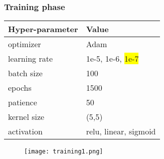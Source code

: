 \begin{frame}
  \frametitle{Training phase}
  \begin{table}[h!]
      \scriptsize
      \centering
      \begin{tabular}{l l}
      \toprule
      \textbf{Hyper-parameter} & \hspace*{2mm}\textbf{Value} \\
      \midrule
      optimizer  & Adam\\
      learning rate  & 1e-5, 1e-6, \colorbox{yellow}{1e-7}\\
      batch size  & 100 \\
      epochs  & 1500 \\
      patience & 50 \\
      kernel size  & (5,5) \\
      activation & relu, linear, sigmoid \\
      \bottomrule
      \end{tabular}
      \label{tab:Parametres}
  \end{table}

  \vspace*{-0.4cm}
    \begin{figure}
    \texttt{[image: training1.png]}    %
    \end{figure}

\end{frame}



